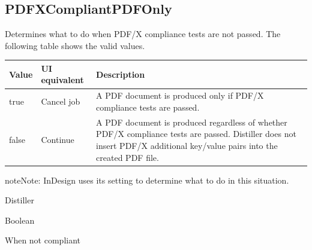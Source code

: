 \documentclass[letterpaper,12pt,english,openany,oneside]{sphinxmanual}
\begin{document}
\begin{sphinxVerbatim}[commandchars=\\\{\}]
\PYG{p}{[}   \PYG{p}{]}
\end{sphinxVerbatim}


\subsection{PDFXCompliantPDFOnly}
\label{\detokenize{PDF_Create_CommonSettings:pdfxcompliantpdfonly}}
Determines what to do when PDF/X compliance tests are not passed. The following table shows the valid values.


\begin{savenotes}\sphinxattablestart
\centering
{}\label{\detokenize{PDF_Create_CommonSettings:section-22}}\nobreak
\begin{tabulary}{\linewidth}[t]{|T|T|T|}
\hline
\sphinxstyletheadfamily 
Value
&\sphinxstyletheadfamily 
UI equivalent
&\sphinxstyletheadfamily 
Description
\\
\hline
true
&
Cancel job
&
A PDF document is produced only if PDF/X compliance tests are passed.
\\
\hline
false
&
Continue
&
A PDF document is produced regardless of whether PDF/X compliance tests are passed. Distiller does not insert PDF/X additional key/value pairs into the created PDF file.
\\
\hline
\end{tabulary}
\par
\sphinxattableend\end{savenotes}

\begin{sphinxadmonition}{note}{Note:}
InDesign uses its  setting to determine what to do in this situation.
\end{sphinxadmonition}
\label{\detokenize{PDF_Create_CommonSettings:supported-by-112}}

Distiller

\label{\detokenize{PDF_Create_CommonSettings:type-111}}

Boolean

\label{\detokenize{PDF_Create_CommonSettings:ui-name-93}}

When not compliant
\end{document}
